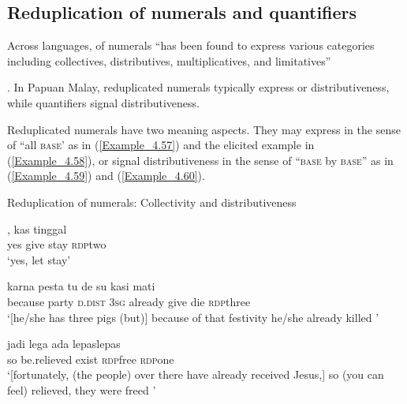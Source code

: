 \subsection{Reduplication of numerals and quantifiers}
\label{Para_4.2.4}
Across languages,  of numerals “has been found to express various categories including collectives, distributives, multiplicatives, and limitatives” {\citep{Rubino.2013}. In Papuan Malay, reduplicated numerals typically express  or distributiveness, while quantifiers signal distributiveness.

Reduplicated numerals have two meaning aspects. They may express  in the sense of ``all \textsc{base}' as in (\ref{Example_4.57}) and the elicited example in (\ref{Example_4.58}), or signal distributiveness in the sense of ``\textsc{base} by \textsc{base}'' as in (\ref{Example_4.59}) and (\ref{Example_4.60}).


\begin{styleExampleTitle}
Reduplication of numerals: Collectivity and distributiveness
\end{styleExampleTitle}

\ea
\label{Example_4.57}
, {kas} {tinggal} {}\\ %
 yes  give  stay  \textsc{rdp}{\Tilde}two\\
\glt 
‘yes, let  stay’ \textstyleExampleSource{[080919-006-CvNP.0018]}\\
\z

\ea
\label{Example_4.58}
\gll {\ldots} {karna} {pesta} {tu} {de} {su} {kasi} {mati} {}\\ %
 { }  because  party  \textsc{d.dist}  \textsc{3sg}  already  give  die  \textsc{rdp}{\Tilde}three\\
\glt 
‘[he/she has three pigs (but)] because of that festivity he/she already killed ’ \textstyleExampleSource{[Elicited BR120813.043]}\\
\z

\ea
\label{Example_4.59}
\gll {\ldots} {jadi} {lega} {ada} {lepas{\Tilde}lepas} {}\\ %
 { }  so  be.relieved  exist  \textsc{rdp}{\Tilde}free  \textsc{rdp}{\Tilde}one\\
\glt 
‘[fortunately, (the people) over there have already received Jesus,] so (you can feel) relieved, they were freed ’ \textstyleExampleSource{[081025-007-Cv.0017]}\\
\z

}
